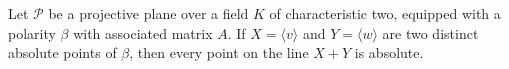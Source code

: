 Let $\mathcal{P}$ be a projective plane over a field $K$ of characteristic two, equipped with a polarity $\beta$ with associated matrix $A$. If $X = \langle v \rangle$ and $Y = \langle w \rangle$ are two distinct absolute points of $\beta$, then every point on the line $X + Y$ is absolute.
